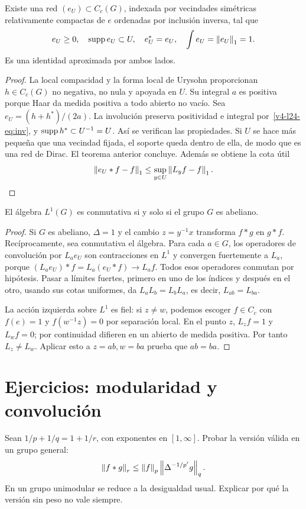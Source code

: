 \begin{lema}\label{v4-l24-l:approx}
Existe una red $(e_U)\subset C_c(G)$, indexada por vecindades simétricas relativamente compactas de $e$ ordenadas por inclusión inversa, tal que
\[
 e_U\geq0,\quad\operatorname{supp} e_U\subset U,\quad e_U^*=e_U,
 \quad\int e_U=\left\lVert e_U\right\rVert_1=1.
\]
Es una identidad aproximada por ambos lados.
\end{lema}
\begin{proof}
La local compacidad y la forma local de Urysohn proporcionan $h\in C_c(G)$ no negativa, no nula y apoyada en $U$. Su integral $a$ es positiva porque Haar da medida positiva a todo abierto no vacío. Sea $e_U=(h+h^*)/(2a)$. La involución preserva positividad e integral por~\eqref{v4-l24-eq:inv}, y $\operatorname{supp} h^*\subset U^{-1}=U$. Así se verifican las propiedades. Si $U$ se hace más pequeña que una vecindad fijada, el soporte queda dentro de ella, de modo que es una red de Dirac. El teorema anterior concluye.
Además se obtiene la cota útil
\begin{equation}\label{v4-l24-eq:approxbound}
 \left\lVert e_U*f-f\right\rVert_1\leq\sup_{y\in U}\left\lVert L_yf-f\right\rVert_1.
\end{equation}
\end{proof}
\begin{teorema}
El álgebra $L^1(G)$ es conmutativa si y solo si el grupo $G$ es abeliano.
\end{teorema}
\begin{proof}
Si $G$ es abeliano, $\Delta=1$ y el cambio $z=y^{-1}x$ transforma $f*g$ en $g*f$. Recíprocamente, sea conmutativa el álgebra. Para cada $a\in G$, los operadores de convolución por $L_ae_U$ son contracciones en $L^1$ y convergen fuertemente a $L_a$, porque $(L_ae_U)*f=L_a(e_U*f)\to L_af$. Todos esos operadores conmutan por hipótesis. Pasar a límites fuertes, primero en uno de los índices y después en el otro, usando sus cotas uniformes, da $L_aL_b=L_bL_a$, es decir, $L_{ab}=L_{ba}$.

La acción izquierda sobre $L^1$ es fiel: si $z\ne w$, podemos escoger $f\in C_c$ con $f(e)=1$ y $f(w^{-1}z)=0$ por separación local. En el punto $z$, $L_zf=1$ y $L_wf=0$; por continuidad difieren en un abierto de medida positiva. Por tanto $L_z\ne L_w$. Aplicar esto a $z=ab,w=ba$ prueba que $ab=ba$.
\end{proof}

\section{Ejercicios: modularidad y convolución}
\begin{ejercicio}\label{ej:v4-l22-1}
Sean $1/p+1/q=1+1/r$, con exponentes en $[1,\infty]$. Probar la versión válida en un grupo general:
\[
 \left\lVert f*g\right\rVert_r\leq\left\lVert f\right\rVert_p\left\lVert\Delta^{-1/p'}g\right\rVert_q.
\]
En un grupo unimodular se reduce a la desigualdad usual. Explicar por qué la versión sin peso no vale siempre.
\end{ejercicio}

